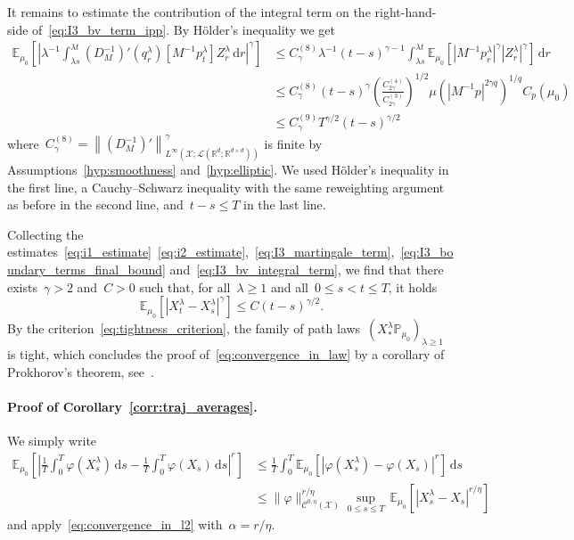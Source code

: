 \documentclass[10pt]{article}
\newcommand{\cL}{\mathcal{L}}
\renewcommand{\d}{\mathrm{d}}
\newcommand{\E}{\mathbb{E}}
\renewcommand{\P}{\mathbb{P}}
\newcommand{\R}{\mathbb{R}}
\newcommand{\cX}{\mathcal{X}}
\newcommand{\cC}{\mathcal{C}}
\newcommand{\1}{\mathbbm 1}
\begin{document}
It remains to estimate the contribution of the integral term on the right-hand-side of~\eqref{eq:I3_bv_term_ipp}. By  H\"older's inequality we get
\begin{equation}
    \label{eq:I3_bv_integral_term}
    \begin{aligned}
    \mathbb E_{\mu_0}\left[\left|\lambda^{-1}\int_{\lambda s}^{\lambda t}\left(D_M^{-1}\right)'(q_r^\lambda)\left[M^{-1}p_t^\lambda\right]Z_r^\lambda\,\d r\right|^\gamma\right]&\leq C_{\gamma}^{(8)}\lambda^{-1}(t-s)^{\gamma-1}\int_{\lambda s}^{\lambda t}\E_{\mu_0}\left[\left|M^{-1}p_r^\lambda\right|^\gamma\left|Z_r^\lambda\right|^\gamma\right]\,\d r\\
&\leq C^{(8)}_{\gamma}(t-s)^{\gamma}\left(\frac{C_{2\gamma}^{(4)}}{C_{2\gamma}^{(3)}}\right)^{1/2}\mu\left(\left|M^{-1}p\right|^{2\gamma q}\right)^{1/q}C_p(\mu_0)\\
&\leq C^{(9)}_{\gamma}T^{\gamma/2}(t-s)^{\gamma/2}
    \end{aligned}
\end{equation}
where~$C^{(8)}_{\gamma}=\left\|\left(D_M^{-1}\right)'\right\|^\gamma_{L^\infty(\cX;\cL(\R^d;\R^{d\times d}))}$ is finite by Assumptions~\ref{hyp:smoothness} and~\ref{hyp:elliptic}.
We used H\"older's inequality in the first line, a Cauchy--Schwarz inequality with the same reweighting argument as before in the second line, and~$t-s\leq T$ in the last line.

Collecting the estimates~\eqref{eq:i1_estimate}~\eqref{eq:i2_estimate},~\eqref{eq:I3_martingale_term},~\eqref{eq:I3_boundary_terms_final_bound} and~\eqref{eq:I3_bv_integral_term}, we find that there exists~$\gamma>2$ and~$C>0$ such that, for all~$\lambda\geq 1$ and all~$0\leq s < t\leq T$, it holds
\begin{equation}
    \label{eq:tightness_final_estimate}
    \E_{\mu_0}\left[\left|X_t^\lambda-X_s^\lambda\right|^\gamma\right] \leq C(t-s)^{\gamma/2}.
\end{equation}
By the criterion~\eqref{eq:tightness_criterion}, the family of path laws~$\left(X^\lambda_*\P_{\mu_0}\right)_{\lambda\geq 1}$ is tight, which concludes the proof of~\eqref{eq:convergence_in_law} by a corollary of Prokhorov's theorem, see~\cite[Theorem 8.1]{B68}.
\paragraph{Proof of Corollary~\ref{corr:traj_averages}.}
We simply write
\begin{equation}
    \begin{aligned}
    \E_{\mu_0}\left[\left|\frac1T\int_0^T \varphi(X_s^\lambda)\,\d s - \frac1T\int_0^T \varphi(X_s)\,\d s\right|^r\right] & \leq \frac1T\int_0^T\E_{\mu_0}\left[\left|\varphi(X_s^\lambda)-\varphi(X_s)\right|^r\right]\,\d s\\
    &\leq \|\varphi\|_{\cC^{0,\eta}(\cX)}^{r/\eta}\underset{0\leq s\leq T}{\sup}\,\E_{\mu_0}\left[\left|X_s^\lambda-X_s\right|^{r/\eta}\right]
    \end{aligned}
\end{equation}
and apply~\eqref{eq:convergence_in_l2} with~$\alpha = r/\eta$.
\end{document}
